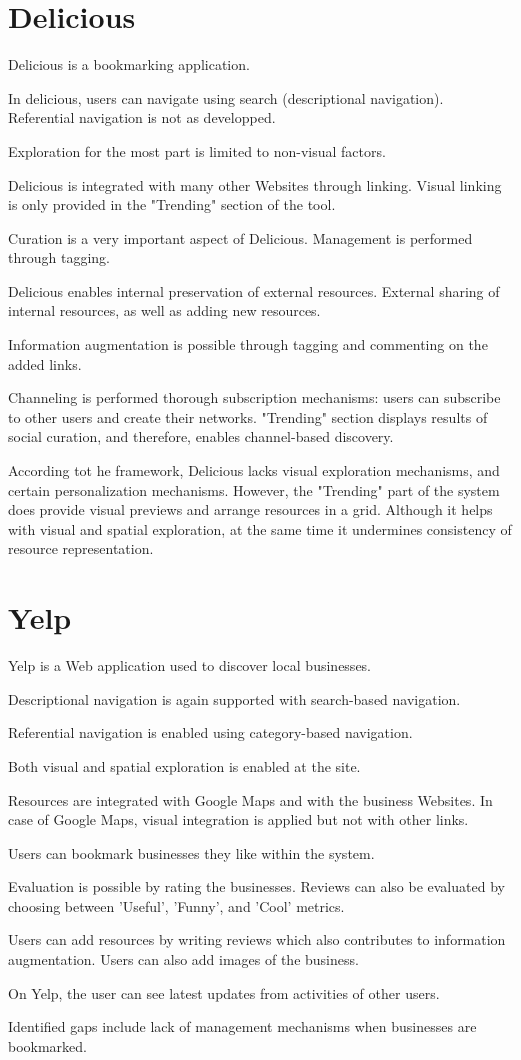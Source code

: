 {\section{Delicious}
Delicious is a bookmarking application. 

In delicious, users can navigate using search (descriptional navigation). Referential navigation is not as developped.

Exploration for the most part is limited to non-visual factors.

Delicious is integrated with many other Websites through linking. Visual linking is only provided in the "Trending" section of the tool.

Curation is a very important aspect of Delicious. Management is performed through tagging. 

Delicious enables internal preservation of external resources. External sharing of internal resources, as well as adding new resources. 

Information augmentation is possible through tagging and commenting on the added links.

Channeling is performed thorough subscription mechanisms: users can subscribe to other users and create their networks. 
"Trending" section displays results of social curation, and therefore, enables channel-based discovery.

According tot he framework, Delicious lacks visual exploration mechanisms, and certain personalization mechanisms. However, the "Trending" part of the system does provide visual previews and arrange resources in a grid. Although it helps with visual and spatial exploration, at the same time it undermines consistency of resource representation. 

} %

{\section{Yelp}
Yelp is a Web application used to discover local businesses. 

Descriptional navigation  is again supported with search-based navigation. 

Referential navigation is enabled using category-based navigation.

Both visual and spatial exploration is enabled at the site. 

Resources are integrated with Google Maps and with the business Websites. In case of Google Maps, visual integration is applied but not with other links.

Users can bookmark businesses they like within the system. 

Evaluation is possible by rating the businesses. Reviews can also be evaluated by choosing between 'Useful', 'Funny', and 'Cool' metrics.

Users can add resources by writing reviews which also contributes to information augmentation. Users can also add images of the business. 

On Yelp, the user can see latest updates from activities of other users. 

Identified gaps include lack of management mechanisms when businesses are bookmarked.
} %

